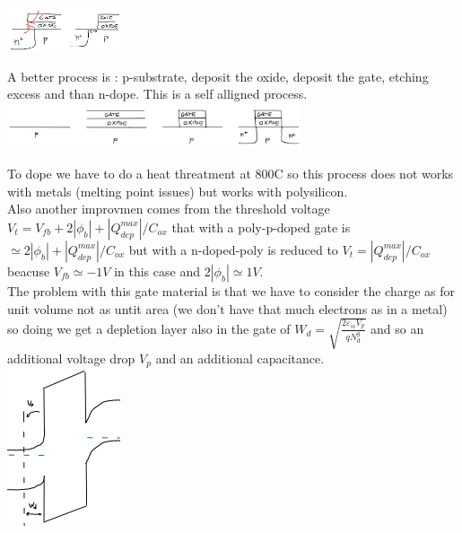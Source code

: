 \centering
\includegraphics[width=0.25\textwidth]{process1par.png}\\
\raggedright

A better process is : p-substrate, deposit the oxide, deposit the gate, etching excess and than n-dope. This is a self alligned process.\\

\centering
\includegraphics[width=0.65\textwidth]{process2.png}\\
\raggedright

To dope we have to do a heat threatment at 800C so this process does not works with metals (melting point issues) but works with polysilicon.\\
Also another improvmen comes from the threshold voltage $V_t=V_{fb}+2|\phi_b|+|Q_{dep}^{max}|/C_{ox}$ that with a poly-p-doped gate is $\simeq 2|\phi_b|+|Q_{dep}^{max}|/C_{ox}$ but with a n-doped-poly is reduced to $V_t=|Q_{dep}^{max}|/C_{ox}$ beacuse $V_{fb}\simeq -1V$ in this case and $2|\phi_b|\simeq 1V$.\\
The problem with this gate material is that we have to consider the charge as for unit volume not as untit area (we don't have that much electrons as in a metal) so doing we get a depletion layer also in the gate of $W_d=\sqrt{\frac{2\varepsilon_{si}V_p}{qN_d^g}}$ and so an additional voltage drop $V_p$ and an additional capacitance.\\

\centering
\includegraphics[width=0.25\textwidth]{polygate.png}\\
\raggedright


